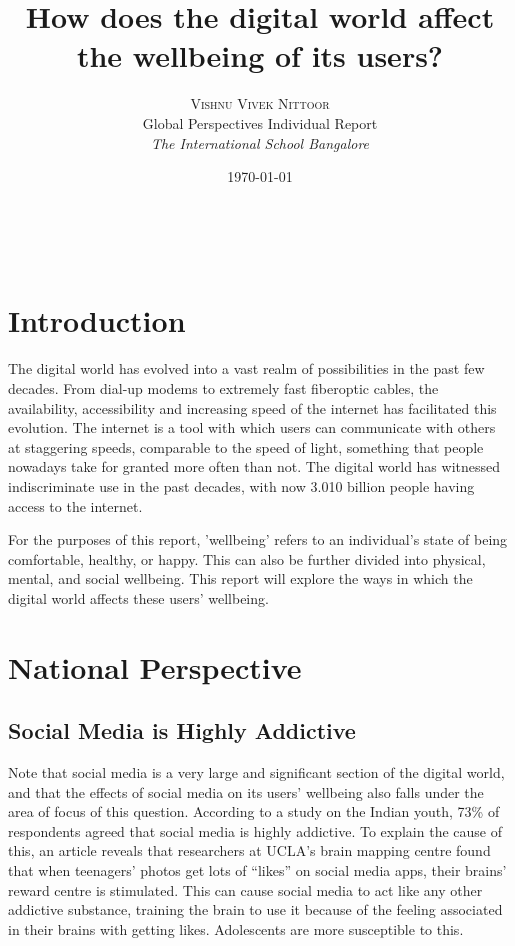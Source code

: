 \documentclass[a4paper, 11pt]{article}
\title{\textbf{How does the digital world affect the wellbeing of its users?}}
\author{\textsc{Vishnu Vivek Nittoor} \\
      Global Perspectives Individual Report\\
      {\textit{The International School Bangalore}}
      }
\date{\today}
\makeatletter
\renewcommand{\maketitle}{
\begin{flushright}
{\LARGE\@title}

\vspace{20pt}

{\large\@author}
\\\@date %

\vspace{40pt} %
\end{flushright}
}
\makeatother
\begin{document}
\maketitle

\vspace{30pt}

\section*{Introduction}

The digital world has evolved into a vast realm of possibilities in the past few decades. From dial-up modems to extremely fast fiberoptic cables, the availability, accessibility and increasing speed of the internet has facilitated this evolution. The internet is a tool with which users can communicate with others at staggering speeds, comparable to the speed of light, something that people nowadays take for granted more often than not.\cite{speedoflight-communication} The digital world has witnessed indiscriminate use in the past decades, with now 3.010 billion people having access to the internet.\cite{world-population-online}

For the purposes of this report, 'wellbeing' refers to an individual's state of being comfortable, healthy, or happy. This can also be further divided into physical, mental, and social wellbeing.\cite{physical-wellbeing-definition, who-mental-wellbeing, social-wellbeing-definition} This report will explore the ways in which the digital world affects these users' wellbeing.

\section{National Perspective}

\subsection{Social Media is Highly Addictive}
\label{national-highly-addictive}
Note that social media is a very large and significant section of the digital world, and that the effects of social media on its users' wellbeing also falls under the area of focus of this question. According to a study on the Indian youth, 73\% of respondents agreed that social media is highly addictive.\cite{indian-youth-study} To explain the cause of this, an article reveals that researchers at UCLA’s brain mapping centre found that when teenagers’ photos get lots of “likes” on social media apps, their brains’ reward centre is stimulated.\cite{teens-social-media-brain} This can cause social media to act like any other addictive substance, training the brain to use it because of the feeling associated in their brains with getting likes. Adolescents are more susceptible to this.
\end{document}
